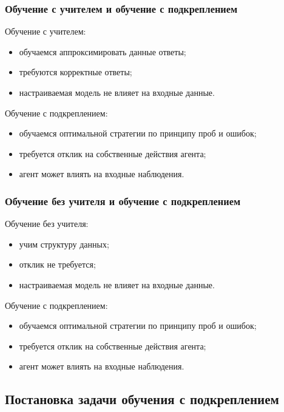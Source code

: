 \documentclass[12pt,a4paper]{article}
\begin{document}
\subsubsection{Обучение с учителем и обучение с подкреплением}

Обучение с учителем:
\begin{itemize}
    \item обучаемся аппроксимировать данные ответы;
    \item требуются корректные ответы;
    \item настраиваемая модель не влияет на входные данные.
\end{itemize}

Обучение с подкреплением:
\begin{itemize}
    \item обучаемся оптимальной стратегии по принципу проб и ошибок;
    \item требуется отклик на собственные действия агента;
    \item агент может влиять на входные наблюдения.
\end{itemize}

\subsubsection{Обучение без учителя и обучение с подкреплением}

Обучение без учителя:
\begin{itemize}
    \item учим структуру данных;
    \item отклик не требуется;
    \item настраиваемая модель не влияет на входные данные.
\end{itemize}

Обучение с подкреплением:
\begin{itemize}
    \item обучаемся оптимальной стратегии по принципу проб и ошибок;
    \item требуется отклик на собственные действия агента;
    \item агент может влиять на входные наблюдения.
\end{itemize}

\subsection{Постановка задачи обучения с подкреплением}
\end{document}
